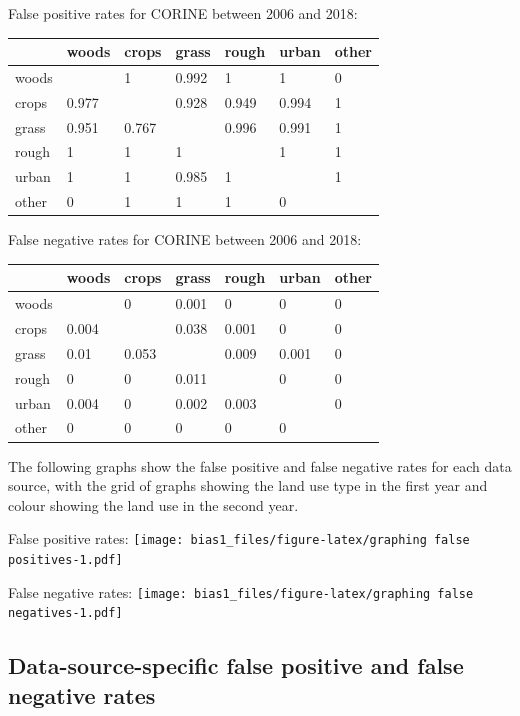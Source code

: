 \documentclass[
]{book}
\begin{document}
False positive rates for CORINE between 2006 and 2018:

\begin{tabular}{l|l|l|l|l|l|l}
\hline
  & woods & crops & grass & rough & urban & other\\
\hline
woods &  & 1 & 0.992 & 1 & 1 & 0\\
\hline
crops & 0.977 &  & 0.928 & 0.949 & 0.994 & 1\\
\hline
grass & 0.951 & 0.767 &  & 0.996 & 0.991 & 1\\
\hline
rough & 1 & 1 & 1 &  & 1 & 1\\
\hline
urban & 1 & 1 & 0.985 & 1 &  & 1\\
\hline
other & 0 & 1 & 1 & 1 & 0 & \\
\hline
\end{tabular}

False negative rates for CORINE between 2006 and 2018:

\begin{tabular}{l|l|l|l|l|l|l}
\hline
  & woods & crops & grass & rough & urban & other\\
\hline
woods &  & 0 & 0.001 & 0 & 0 & 0\\
\hline
crops & 0.004 &  & 0.038 & 0.001 & 0 & 0\\
\hline
grass & 0.01 & 0.053 &  & 0.009 & 0.001 & 0\\
\hline
rough & 0 & 0 & 0.011 &  & 0 & 0\\
\hline
urban & 0.004 & 0 & 0.002 & 0.003 &  & 0\\
\hline
other & 0 & 0 & 0 & 0 & 0 & \\
\hline
\end{tabular}

The following graphs show the false positive and false negative rates for each data source, with the grid of graphs showing the land use type in the first year and colour showing the land use in the second year.

False positive rates:
\texttt{[image: bias1\_files/figure-latex/graphing false positives-1.pdf]}

False negative rates:
\texttt{[image: bias1\_files/figure-latex/graphing false negatives-1.pdf]}

\hypertarget{data-source-specific-false-positive-and-false-negative-rates}{%
\subsection{Data-source-specific false positive and false negative rates}\label{data-source-specific-false-positive-and-false-negative-rates}}
\end{document}
